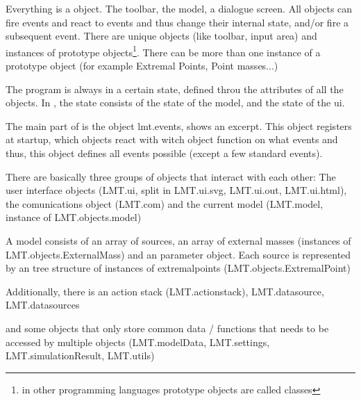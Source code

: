 Everything is a object. The toolbar, the model, a dialogue screen.
All objects can fire events and react to events and thus change their internal state, and/or fire a subsequent event.
There are unique objects (like toolbar, input area) and instances of prototype objects\footnote{in other programming languages prototype objects are called classes}. There can be more than one instance of a prototype object (for example Extremal Points, Point masses...)

The program is always in a certain state, defined throu the attributes of all the objects. In \spl, the state consists of the state of the model, and the state of the ui.

The main part of \spl is the object lmt.events,  shows an excerpt. This object registers at startup, which objects react with witch object function on what events and thus, this object defines all events possible (except a few standard events).


There are basically three groups of objects that interact with each other: The user interface objects (LMT.ui, split in LMT.ui.svg, LMT.ui.out, LMT.ui.html), the comunications object (LMT.com) and the current model (LMT.model, instance of LMT.objects.model)

A model consists of an array of sources, an array of external masses (instances of LMT.objects.ExternalMass) and an parameter object. Each source is represented by an tree structure of instances of extremalpoints (LMT.objects.ExtremalPoint)

Additionally, there is an action stack (LMT.actionstack), LMT.datasource, LMT.datasources

and some objects that only store common data / functions that needs to be accessed by multiple objects (LMT.modelData, LMT.settings, LMT.simulationResult, LMT.utils)


